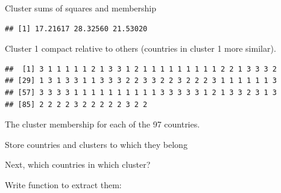 \documentclass[
  ignorenonframetext,
]{beamer}
\newenvironment{Shaded}{\begin{snugshade}}{\end{snugshade}}
\newcommand{\ControlFlowTok}[1]{\textcolor[rgb]{0.13,0.29,0.53}{\textbf{#1}}}
\newcommand{\DataTypeTok}[1]{\textcolor[rgb]{0.13,0.29,0.53}{#1}}
\newcommand{\FloatTok}[1]{\textcolor[rgb]{0.00,0.00,0.81}{#1}}
\newcommand{\KeywordTok}[1]{\textcolor[rgb]{0.13,0.29,0.53}{\textbf{#1}}}
\newcommand{\NormalTok}[1]{#1}
\newcommand{\OperatorTok}[1]{\textcolor[rgb]{0.81,0.36,0.00}{\textbf{#1}}}
\newcommand{\StringTok}[1]{\textcolor[rgb]{0.31,0.60,0.02}{#1}}
\begin{document}
\begin{frame}[fragile]{Cluster sums of squares and membership}
\protect\hypertarget{cluster-sums-of-squares-and-membership}{}

\begin{Shaded}
\end{Shaded}

\begin{verbatim}
## [1] 17.21617 28.32560 21.53020
\end{verbatim}

Cluster 1 compact relative to others (countries in cluster 1 more
similar).

\begin{Shaded}
\end{Shaded}

\begin{verbatim}
##  [1] 3 1 1 1 1 1 2 1 3 3 1 2 1 1 1 1 1 1 1 1 1 2 2 1 3 3 3 2
## [29] 1 3 1 3 3 1 1 3 3 3 2 2 3 3 2 2 3 2 2 2 3 1 1 1 1 1 1 3
## [57] 3 3 3 3 1 1 1 1 1 1 1 1 1 1 3 3 3 3 3 1 2 1 3 3 2 3 1 3
## [85] 2 2 2 2 3 2 2 2 2 2 3 2 2
\end{verbatim}

The cluster membership for each of the 97 countries.

\end{frame}

\begin{frame}[fragile]{Store countries and clusters to which they
belong}
\protect\hypertarget{store-countries-and-clusters-to-which-they-belong}{}

\begin{Shaded}
\end{Shaded}

Next, which countries in which cluster?

Write function to extract them:

\begin{Shaded}
\end{Shaded}

\end{frame}
\end{document}

